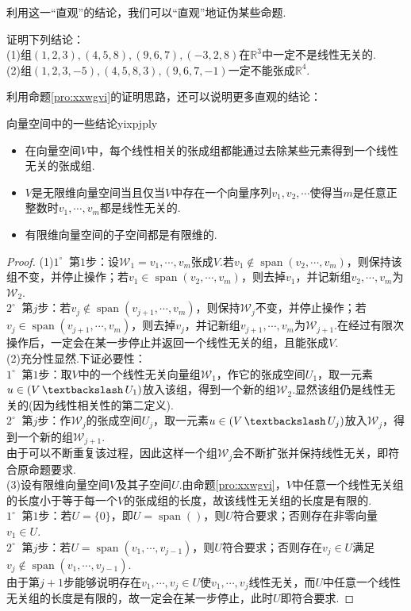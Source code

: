 \documentclass[lang=cn, zihao=5]{elegantbook}
\newcommand{\R}{\mathbb{R}}
\newcommand{\buzhou}[1]{$#1^{\circ} \ $}
\DeclareMathOperator{\spn}{span}
\DeclareMathOperator{\setjianfa}{\textbackslash}
\begin{document}
利用这一“直观”的结论，我们可以“直观”地证伪某些命题.

\begin{example}
	证明下列结论： \\
	(1)组$(1,2,3),(4,5,8),(9,6,7),(-3,2,8)$在$\R ^{3}$中一定不是线性无关的. \\
	(2)组$(1,2,3,-5),(4,5,8,3),(9,6,7,-1)$一定不能张成$\R ^{4}$.
\end{example}

利用命题\ref{pro:xxwgvi}的证明思路，还可以说明更多直观的结论：

\begin{proposition}{向量空间中的一些结论}{yixpjply}
	\begin{itemize}
		\item 在向量空间$V$中，每个线性相关的张成组都能通过去除某些元素得到一个线性无关的张成组.
		\item $V$是无限维向量空间当且仅当$V$中存在一个向量序列$v_1, v_2, \cdots$使得当$m$是任意正整数时$v_1, \cdots ,v_m$都是线性无关的.
		\item 有限维向量空间的子空间都是有限维的.
	\end{itemize}
\end{proposition}
\begin{proof}
	(1)\buzhou{1} 第$1$步：设$\mathcal{W}_1 = v_1, \cdots ,v_m$张成$V$.若$v_1 \notin \spn (v_2, \cdots ,v_m)$，则保持该组不变，并停止操作；若$v_1 \in \spn (v_2, \cdots ,v_m)$，则去掉$v_1$，并记新组$v_2, \cdots , v_m$为$\mathcal{W}_2$. \\
	\buzhou{2} 第$j$步：若$v_j \notin \spn (v_{j+1}, \cdots ,v_m)$，则保持$\mathcal{W}_j$不变，并停止操作；若$v_j \in \spn (v_{j+1}, \cdots ,v_m)$，则去掉$v_j$，并记新组$v_{j+1}, \cdots , v_m$为$\mathcal{W}_{j+1}$.在经过有限次操作后，一定会在某一步停止并返回一个线性无关的组，且能张成$V$. \\
	(2)充分性显然.下证必要性： \\
	\buzhou{1} 第$1$步：取$V$中的一个线性无关向量组$\mathcal{W}_1$，作它的张成空间$U_1$，取一元素$u \in (V \setjianfa U_1)$放入该组，得到一个新的组$\mathcal{W}_2$.显然该组仍是线性无关的(因为线性相关性的第二定义). \\
	\buzhou{2} 第$j$步：作$\mathcal{W}_j$的张成空间$U_j$，取一元素$u \in (V \setjianfa U_j)$放入$\mathcal{W}_j$，得到一个新的组$\mathcal{W}_{j+1}$. \\
	由于可以不断重复该过程，因此这样一个组$\mathcal{W}_j$会不断扩张并保持线性无关，即符合原命题要求. \\
	(3)设有限维向量空间$V$及其子空间$U$.由命题\ref{pro:xxwgvi}，$V$中任意一个线性无关组的长度小于等于每一个$V$的张成组的长度，故该线性无关组的长度是有限的. \\
	\buzhou{1} 第$1$步：若$U=\{ 0 \}$，即$U = \spn ()$，则$U$符合要求；否则存在非零向量$v_1 \in U$. \\
	\buzhou{2} 第$j$步：若$U= \spn (v_1,\cdots ,v_{j-1})$，则$U$符合要求；否则存在$v_j \in U$满足$v_j \notin \spn (v_1,\cdots ,v_{j-1})$. \\
	由于第$j+1$步能够说明存在$v_1, \cdots , v_j \in U$使$v_1, \cdots , v_j$线性无关，而$U$中任意一个线性无关组的长度是有限的，故一定会在某一步停止，此时$U$即符合要求.
\end{proof}
\end{document}

